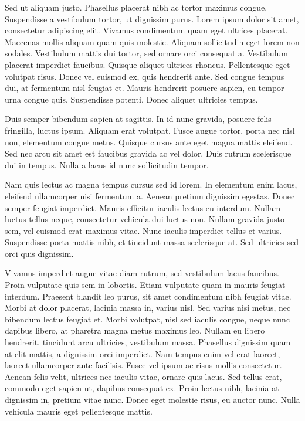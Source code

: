 Sed ut aliquam justo. Phasellus placerat nibh ac tortor maximus congue. Suspendisse a vestibulum tortor, ut dignissim purus. Lorem ipsum dolor sit amet, consectetur adipiscing elit. Vivamus condimentum quam eget ultrices placerat. Maecenas mollis aliquam quam quis molestie. Aliquam sollicitudin eget lorem non sodales. Vestibulum mattis dui tortor, sed ornare orci consequat a. Vestibulum placerat imperdiet faucibus. Quisque aliquet ultrices rhoncus. Pellentesque eget volutpat risus. Donec vel euismod ex, quis hendrerit ante. Sed congue tempus dui, at fermentum nisl feugiat et. Mauris hendrerit posuere sapien, eu tempor urna congue quis. Suspendisse potenti. Donec aliquet ultricies tempus.

Duis semper bibendum sapien at sagittis. In id nunc gravida, posuere felis fringilla, luctus ipsum. Aliquam erat volutpat. Fusce augue tortor, porta nec nisl non, elementum congue metus. Quisque cursus ante eget magna mattis eleifend. Sed nec arcu sit amet est faucibus gravida ac vel dolor. Duis rutrum scelerisque dui in tempus. Nulla a lacus id nunc sollicitudin tempor.

Nam quis lectus ac magna tempus cursus sed id lorem. In elementum enim lacus, eleifend ullamcorper nisi fermentum a. Aenean pretium dignissim egestas. Donec semper feugiat imperdiet. Mauris efficitur iaculis lectus eu interdum. Nullam luctus tellus neque, consectetur vehicula dui luctus non. Nullam gravida justo sem, vel euismod erat maximus vitae. Nunc iaculis imperdiet tellus et varius. Suspendisse porta mattis nibh, et tincidunt massa scelerisque at. Sed ultricies sed orci quis dignissim.

Vivamus imperdiet augue vitae diam rutrum, sed vestibulum lacus faucibus. Proin vulputate quis sem in lobortis. Etiam vulputate quam in mauris feugiat interdum. Praesent blandit leo purus, sit amet condimentum nibh feugiat vitae. Morbi at dolor placerat, lacinia massa in, varius nisl. Sed varius nisi metus, nec bibendum lectus feugiat et. Morbi volutpat, nisl sed iaculis congue, neque nunc dapibus libero, at pharetra magna metus maximus leo. Nullam eu libero hendrerit, tincidunt arcu ultricies, vestibulum massa. Phasellus dignissim quam at elit mattis, a dignissim orci imperdiet. Nam tempus enim vel erat laoreet, laoreet ullamcorper ante facilisis. Fusce vel ipsum ac risus mollis consectetur. Aenean felis velit, ultrices nec iaculis vitae, ornare quis lacus. Sed tellus erat, commodo eget sapien ut, dapibus consequat ex. Proin lectus nibh, lacinia at dignissim in, pretium vitae nunc. Donec eget molestie risus, eu auctor nunc. Nulla vehicula mauris eget pellentesque mattis.

